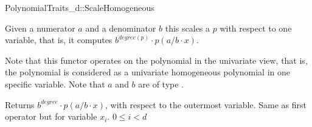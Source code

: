 \begin{ccRefConcept}{PolynomialTraits_d::ScaleHomogeneous}
\ccDefinition

Given a numerator $a$ and a denominator $b$ this  
scales a  $p$ with respect to one variable, 
that is, it computes $b^{degree(p)}\cdot p(a/b\cdot x)$.

Note that this functor operates on the polynomial in the univariate view, that is, 
the polynomial is considered as a univariate homogeneous polynomial in one specific variable. 
Note that $a$ and $b$ are of type .


\ccRefines 
{}

\ccTypes


\ccOperations
{}
         { Returns $b^{degree}\cdot p(a/b\cdot x)$, 
        with respect to the outermost variable. }
         { Same as first operator but for variable $x_i$. 
        \ccPrecond $0 \leq i  < d$
         }


\ccSeeAlso

\\
\\

\end{ccRefConcept}